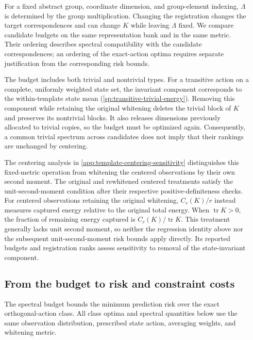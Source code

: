 For a fixed abstract group, coordinate dimension, and
group-element indexing, $\Lambda$ is determined by the
group multiplication.
Changing the registration changes the target
correspondences and can change $K$ while leaving
$\Lambda$ fixed.
We compare candidate budgets on the same representation
bank and in the same metric.
Their ordering describes spectral compatibility with
the candidate correspondences; an ordering of the
exact-action optima requires separate justification
from the corresponding risk bounds.

The budget includes both trivial and nontrivial types.
For a transitive action on a complete, uniformly weighted
state set, the invariant component corresponds to the
within-template state mean
(\cref{sp:transitive-trivial-energy}).
Removing this component while retaining the original
whitening deletes the trivial block of $K$ and preserves
its nontrivial blocks.
It also releases dimensions previously allocated to
trivial copies, so the budget must be optimized again.
Consequently, a common trivial spectrum across candidates
does not imply that their rankings are unchanged by
centering.

The centering analysis in
\cref{app:template-centering-sensitivity}
distinguishes this fixed-metric operation from whitening
the centered observations by their own second moment.
The original and rewhitened centered treatments satisfy
the unit-second-moment condition after their respective
positive-definiteness checks.
For centered observations retaining the original whitening,
$C_r(K)/r$ instead measures captured energy relative to
the original total energy.
When $\operatorname{tr}K>0$, the fraction of remaining
energy captured is $C_r(K)/\operatorname{tr}K$.
This treatment generally lacks unit second moment, so
neither the regression identity above nor the subsequent
unit-second-moment risk bounds apply directly.
Its reported budgets and registration ranks assess
sensitivity to removal of the state-invariant component.

\subsection{From the budget to risk and constraint costs}

The spectral budget bounds the minimum prediction risk over
the exact orthogonal-action class.
All class optima and spectral quantities below use the same
observation distribution, prescribed state action, averaging
weights, and whitening metric.

